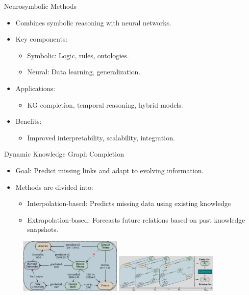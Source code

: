 \documentclass{beamer}
\begin{document}
    \begin{frame}{Neurosymbolic Methods}
        \begin{itemize}
            \item Combines symbolic reasoning with neural networks.
            \item Key components: 
            \begin{itemize}
                \item Symbolic: Logic, rules, ontologies.
                \item Neural: Data learning, generalization.
        \end{itemize}
        \item Applications: 
        \begin{itemize}
            \item KG completion, temporal reasoning, hybrid models.
        \end{itemize}
        \item Benefits: 
        \begin{itemize}
            \item Improved interpretability, scalability, integration.
        \end{itemize}
        \end{itemize}
    \end{frame}

    \begin{frame}{Dynamic Knowledge Graph Completion}
        \begin{itemize}
            \item Goal: Predict missing links and adapt to evolving information.
            \item Methods are divided into:
                \begin{itemize}
                    \item Interpolation-based: Predicts missing data using existing knowledge
                    \item Extrapolation-based: Forecasts future relations based on past knowledge snapshots.
                \end{itemize}
        \end{itemize}
        \begin{figure}[h!]
            \centering
            \includegraphics[width=0.45\textwidth]{img/interpolation.png}
            \includegraphics[width=0.45\textwidth]{img/extrapolation.png}
        \end{figure}
    \end{frame}
\end{document}
